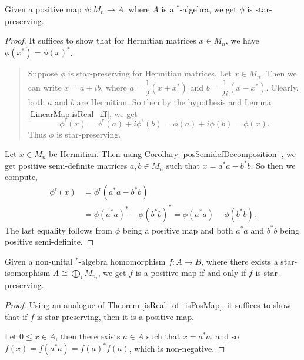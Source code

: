  \begin{theorem}\label{isReal_of_isPosMap}
  \leanok
  Given a positive map $\phi\colon M_n \to A$, where $A$ is a $^*$-algebra, we get $\phi$ is star-preserving.
 \end{theorem}
 \begin{proof}
  \leanok
  It suffices to show that for Hermitian matrices $x\in M_n$, we have $\phi(x^*)=\phi(x)^*$.
  \begin{quote}
   Suppose $\phi$ is star-preserving for Hermitian matrices.
   Let $x\in M_n$. Then we can write $x=a+ib$, where $a=\dfrac{1}{2}(x+x^*)$ and $b=\dfrac{1}{2i}(x-x^*)$. Clearly, both $a$ and $b$ are Hermitian. So then by the hypothesis and Lemma \ref{LinearMap.isReal_iff}, we get
   \[\phi^\operatorname{r}(x)=\phi^{\operatorname{r}}(a)+i\phi^{\operatorname{r}}(b)=\phi(a)+i\phi(b)=\phi(x).\]
   Thus $\phi$ is star-preserving.
  \end{quote}
  Let $x\in M_n$ be Hermitian. Then using Corollary \ref{posSemidefDecomposition'}, we get positive semi-definite matrices $a,b\in{M_n}$ such that $x=a^*a-b^*b$. So then we compute,
  \begin{align*}
   \phi^{\operatorname{r}}(x) &={\phi}^{\operatorname{r}}(a^*a-b^*b)\\
    &= {\phi(a^*a)}^*-{\phi(b^*b)}^*=\phi(a^*a)-\phi(b^*b).
  \end{align*}
  The last equality follows from $\phi$ being a positive map and both $a^*a$ and $b^*b$ being positive semi-definite.
 \end{proof}

 \begin{corollary}\label{NonUnitalAlgHom.isPosMap_iff}
  \leanok
  Given a non-unital $^*$-algebra homomorphism $f\colon A \to B$, where there exists a star-isomorphism $A\cong\bigoplus_iM_{n_i}$, we get $f$ is a positive map if and only if $f$ is star-preserving.
 \end{corollary}
 \begin{proof}\leanok
  Using an analogue of Theorem \ref{isReal_of_isPosMap}, it suffices to show that if $f$ is star-preserving, then it is a positive map.
  
  Let $0\leq x\in A$, then there exists $a\in A$ such that $x=a^*a$, and so $f(x)=f(a^*a)=f(a)^*f(a)$, which is non-negative.
 \end{proof}
